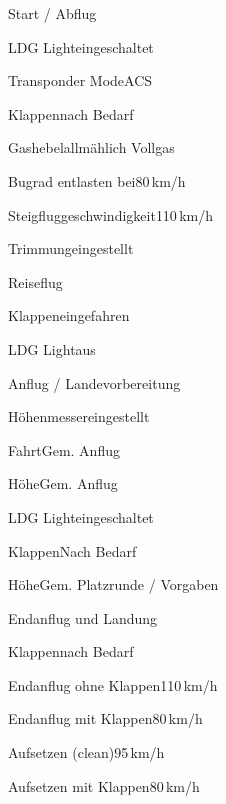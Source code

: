 \begin{checklist}{Start / Abflug}
	  \item{LDG Light}{eingeschaltet}
	  \item{Transponder Mode}{ACS}
	  \item{Klappen}{nach Bedarf}
	  \item{Gashebel}{allmählich Vollgas}
	\item{Bugrad entlasten bei}{80\,km/h}
	\item{Steigfluggeschwindigkeit}{110\,km/h}
	\item{Trimmung}{eingestellt}
\end{checklist}
	

\begin{checklist}{Reiseflug}
	\item{Klappen}{eingefahren}
	\item{LDG Light}{aus}
\end{checklist}



\begin{checklist}{Anflug / Landevorbereitung}
	\item{Höhenmesser}{eingestellt}
	\item{Fahrt}{Gem. Anflug}
	\item{Höhe}{Gem. Anflug}
	\item{LDG Light}{eingeschaltet}
	\item{Klappen}{Nach Bedarf}
	\item{Höhe}{Gem. Platzrunde / Vorgaben}
\end{checklist}


\begin{checklist}{Endanflug und Landung}
	\item{Klappen}{nach Bedarf}
	\item{Endanflug ohne Klappen}{110\,km/h}
	\item{Endanflug mit Klappen}{80\,km/h}
	\item{Aufsetzen (clean)}{95\,km/h}
	\item{Aufsetzen mit Klappen}{80\,km/h}
\end{checklist}


